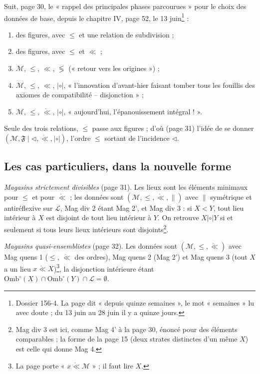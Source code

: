 \documentclass[11pt,a4paper]{article}
\begin{document}
Suit, page 30, le « rappel des principales phases parcourues » pour le choix
des données de base, depuis le chapitre IV, page 52, le 13
juin\footnote{Dossier 156-4. La page dit « depuis quinze semaines », le mot
« semaines » lu avec doute ; du 13 juin au 28 juin il y a quinze jours.} :
\begin{enumerate}
\item[--] des figures, avec $\leq$ et une relation de subdivision ;
\item[--] des figures, avec $\leq$ et $\ll$ ;
\item[--] $\mathcal{M}$, $\leq$, $\ll$, $\lessgtr$ (« retour vers les
origines ») ;
\item[--] $\mathcal{M}$, $\leq$, $\ll$, $\mathrel{|\circ|}$, « l'innovation
d'avant-hier faisant tomber tous les fouillis des axiomes de compatibilité --
disjonction » ;
\item[--] $\mathcal{M}$, $\leq$, $\mathring{\ll}$, $\mathrel{|\circ|}$,
« aujourd'hui, l'épanouissement intégral ! ».
\end{enumerate}
Seule des trois relations, $\leq$ passe aux figures ; d'où (page 31) l'idée de
se donner $(\mathcal{M}, \mathfrak{F} \mid \lhd, \mathring{\ll},
\mathrel{|\circ|})$, l'ordre $\leq$ sortant de l'incidence $\lhd$.

\subsection*{Les cas particuliers, dans la nouvelle forme}

\emph{Magasins strictement divisibles} (page 31). Les lieux sont les éléments
minimaux pour $\leq$ et pour $\mathring{\ll}$ ; les données sont $(\mathcal{M},
\leq, \mathring{\ll}, \parallel)$ avec $\parallel$ symétrique et antiréflexive
sur $\mathcal{L}$, Mag div 2 étant Mag 2', et Mag div 3 : si $X < Y$, tout lieu
intérieur à $X$ est disjoint de tout lieu intérieur à $Y$. On retrouve $X
\mathrel{|\circ|} Y$ si et seulement si tous leurs lieux intérieurs sont
disjoints\footnote{Mag div 3 est ici, comme Mag 4' à la page 30, énoncé pour
des éléments comparables ; la forme de la page 15 (deux strates distinctes d'un
même $X$) est celle qui donne Mag 4.}.

\emph{Magasins quasi-ensemblistes} (page 32). Les données sont $(\mathcal{M},
\leq, \mathring{\ll})$ avec Mag quens 1 ($\leq$, $\mathring{\ll}$ des ordres),
Mag quens 2 (Mag 2') et Mag quens 3 (tout $X$ a un lieu $x
\mathrel{\mathring{\ll}} X$)\footnote{La page porte « $x
\mathrel{\mathring{\ll}} \mathcal{M}$ » ; il faut lire $X$.}, la disjonction
intérieure étant $\mathrm{Omb}^{\circ}(X) \cap \mathrm{Omb}^{\circ}(Y) \cap
\mathcal{L} = \emptyset$.
\end{document}
